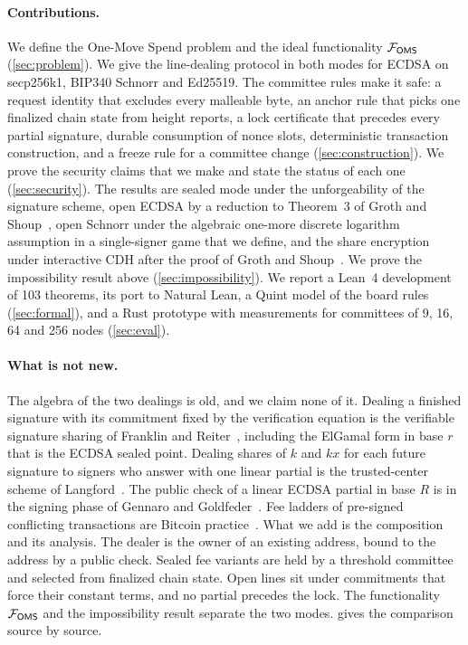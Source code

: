 \paragraph{Contributions.} We define the One-Move Spend problem and the ideal functionality $\mathcal{F}_{\mathsf{OMS}}$ (\cref{sec:problem}). We give the line-dealing protocol in both modes for ECDSA on secp256k1, BIP340 Schnorr and Ed25519. The committee rules make it safe: a request identity that excludes every malleable byte, an anchor rule that picks one finalized chain state from height reports, a lock certificate that precedes every partial signature, durable consumption of nonce slots, deterministic transaction construction, and a freeze rule for a committee change (\cref{sec:construction}). We prove the security claims that we make and state the status of each one (\cref{sec:security}). The results are sealed mode under the unforgeability of the signature scheme, open ECDSA by a reduction to Theorem~3 of Groth and Shoup~\cite{GS21}, open Schnorr under the algebraic one-more discrete logarithm assumption in a single-signer game that we define, and the share encryption under interactive CDH after the proof of Groth and Shoup~\cite{GS22}. We prove the impossibility result above (\cref{sec:impossibility}). We report a Lean~4 development of 103 theorems, its port to Natural Lean, a Quint model of the board rules (\cref{sec:formal}), and a Rust prototype with measurements for committees of 9, 16, 64 and 256 nodes (\cref{sec:eval}).

\paragraph{What is not new.} The algebra of the two dealings is old, and we claim none of it. Dealing a finished signature with its commitment fixed by the verification equation is the verifiable signature sharing of Franklin and Reiter~\cite{FR95}, including the ElGamal form in base $r$ that is the ECDSA sealed point. Dealing shares of $k$ and $kx$ for each future signature to signers who answer with one linear partial is the trusted-center scheme of Langford~\cite{Lan95}. The public check of a linear ECDSA partial in base $R$ is in the signing phase of Gennaro and Goldfeder~\cite{GG20}. Fee ladders of pre-signed conflicting transactions are Bitcoin practice~\cite{SHMB20a,SHMB20b,Todd23}. What we add is the composition and its analysis. The dealer is the owner of an existing address, bound to the address by a public check. Sealed fee variants are held by a threshold committee and selected from finalized chain state. Open lines sit under commitments that force their constant terms, and no partial precedes the lock. The functionality $\mathcal{F}_{\mathsf{OMS}}$ and the impossibility result separate the two modes.  gives the comparison source by source.

